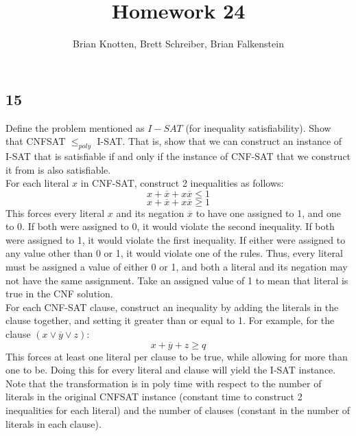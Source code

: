 \documentclass[letterpaper,notitlepage,twoside]{article}
\begin{document}
\title{Homework 24}
\author{Brian Knotten, Brett Schreiber, Brian Falkenstein}
\maketitle
\subsection*{15}
Define the problem mentioned as $I-SAT$ (for inequality satisfiability). Show that CNFSAT $\leq _{poly}$ I-SAT. That is, show that we can construct an instance of I-SAT that is satisfiable if and only if the instance of CNF-SAT that we construct it from is also satisfiable. \\
For each literal $x$ in CNF-SAT, construct 2 inequalities as follows:\\
$$x + \overline x + x\overline x \leq 1$$
$$x + \overline x + x\overline x \geq 1$$
This forces every literal $x$ and its negation $\overline x$ to have one assigned to 1, and one to 0. If both were assigned to  0, it would violate the second inequality. If both were assigned to 1, it would violate the first inequality. If either were assigned to any value other than 0 or 1, it would violate one of the rules. Thus, every literal must be assigned a value of either 0 or 1, and both a literal and its negation may not have the same assignment. Take an assigned value of 1 to mean that literal is true in the CNF solution. \\
For each CNF-SAT clause, construct an inequality by adding the literals in the clause together, and setting it greater than or equal to 1. For example, for the clause $(x \vee \overline y \vee  z)$:
$$x + \overline y + z \geq q$$
This forces at least one literal per clause to be true, while allowing for more than one to be. Doing this for every literal and clause will yield the I-SAT instance. Note that the transformation is in poly time with respect to the number of literals in the original CNFSAT instance (constant time to construct 2 inequalities for each literal) and the number of clauses (constant in the number of literals in each clause). 
\end{document}
